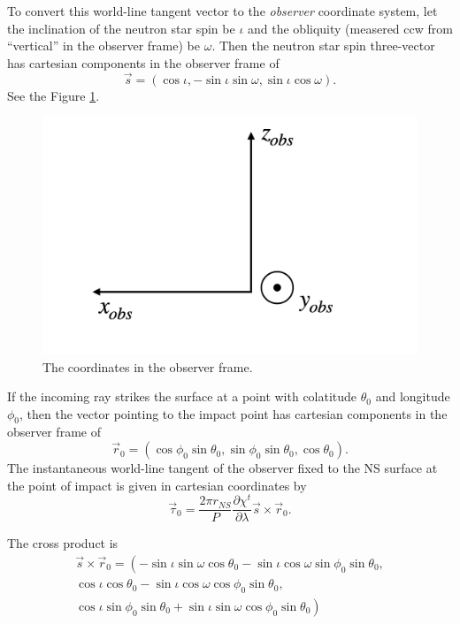 \documentclass[modern]{aastex631}
\begin{document}
To convert this world-line tangent vector to the \emph{observer} coordinate
system, let the inclination of the neutron star spin be $\iota$ and the
obliquity (measered ccw from ``vertical'' in the observer frame) be $\omega$.
Then the neutron star spin three-vector has cartesian components in the observer
frame of 
\begin{equation}
    \vec{s} = \left( \cos \iota, -\sin \iota \sin \omega, \sin \iota \cos \omega \right).
\end{equation}
See the Figure \ref{fig:obs_cart}.
\begin{figure}
    \centering
        \includegraphics[width=0.9\columnwidth]{obs_cart_coord.png}
        \caption{The coordinates in the observer frame.}
        \label{fig:obs_cart}
    \end{figure}
If the incoming ray strikes the surface at a point with colatitude $\theta_0$
and longitude $\phi_0$, then the vector pointing to the impact point has
cartesian components in the observer frame of 
\begin{equation}
    \vec{r}_0 = \left( \cos \phi_0 \sin \theta_0, \sin\phi_0 \sin \theta_0, \cos \theta_0 \right).
\end{equation}
The instantaneous world-line tangent of the observer fixed to the NS surface at
the point of impact is given in cartesian coordinates by
\begin{equation}
    \label{eq:tangent_vel}
    \vec{\tau}_0 = \frac{2 \pi r_{NS}}{P} \frac{\partial \chi^t}{\partial \lambda} \vec{s} \times \vec{r}_0. 
\end{equation}

The cross product is 
\begin{align*}
        \vec{s} \times \vec{r}_0 = \left(
        -\sin \iota \sin \omega \cos \theta_0 - \sin \iota \cos \omega \sin\phi_0 \sin \theta_0, \right. \\
        \left. \cos \iota \cos \theta_0 - \sin \iota \cos \omega \cos \phi_0 \sin \theta_0, \right. \\
        \left. \cos \iota \sin\phi_0 \sin \theta_0 + \sin \iota \sin \omega \cos \phi_0 \sin \theta_0 \right)
\end{align*}
    
\end{document}
